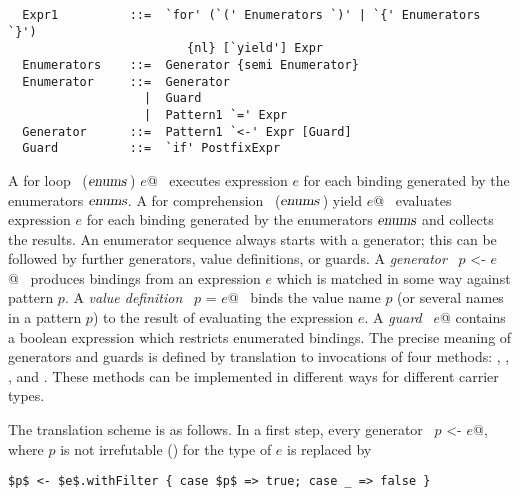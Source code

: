 \syntax\begin{lstlisting}
  Expr1          ::=  `for' (`(' Enumerators `)' | `{' Enumerators `}') 
                         {nl} [`yield'] Expr
  Enumerators    ::=  Generator {semi Enumerator}
  Enumerator     ::=  Generator 
                   |  Guard
                   |  Pattern1 `=' Expr
  Generator      ::=  Pattern1 `<-' Expr [Guard]
  Guard          ::=  `if' PostfixExpr
\end{lstlisting}

A for loop ~\lstinline@for ($\mbox{\sl enums}\,$) $e$@~ executes expression $e$
for each binding generated by the enumerators $\mbox{\sl enums}$.  A for
comprehension ~\lstinline@for ($\mbox{\sl enums}\,$) yield $e$@~ evaluates
expression $e$ for each binding generated by the enumerators $\mbox{\sl enums}$
and collects the results. An enumerator sequence always starts with a
generator; this can be followed by further generators, value
definitions, or guards.  A {\em generator} ~\lstinline@$p$ <- $e$@~
produces bindings from an expression $e$ which is matched in some way
against pattern $p$. A {\em value definition} ~\lstinline@$p$ = $e$@~ 
binds the value name $p$ (or several names in a pattern $p$) to
the result of evaluating the expression $e$.  A {\em guard}
~\lstinline@if $e$@ contains a boolean expression which restricts
enumerated bindings. The precise meaning of generators and guards is
defined by translation to invocations of four methods: ,
, , and . These methods can
be implemented in different ways for different carrier types.

The translation scheme is as follows.  In a first step, every
generator ~\lstinline@$p$ <- $e$@, where $p$ is not irrefutable ()
for the type of $e$ is replaced by
\begin{lstlisting}
$p$ <- $e$.withFilter { case $p$ => true; case _ => false }
\end{lstlisting}

